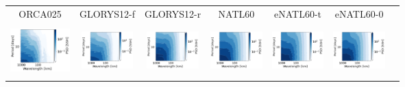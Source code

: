 \documentclass[draft]{agujournal2019}
\begin{document}
\begin{figure}[H]
\begin{minipage}{.80\linewidth}
\begin{subfigure}[t]{.9\linewidth}
\small
\begin{center}
\setlength{\tabcolsep}{1pt}

\begin{tabular}[t]{c@{}cccccc}

\hspace{0cm} ORCA025 & 
 GLORYS12-f & 
 GLORYS12-r & 
 NATL60 & 
 eNATL60-t & 
 eNATL60-0 & \\


\includegraphics[trim={0 19mm 35mm 5mm},clip, width=2.3cm,height=2cm]{figures/plots2/orca025_train_psd_spacetime.png} &
\includegraphics[trim={19mm 19mm 35mm 5mm},clip, width=2cm,height=2cm]{figures/plots2/glorys12-f_train_psd_spacetime.png} &
\includegraphics[trim={19mm 19mm 35mm 5mm},clip, width=2cm,height=2cm]{figures/plots2/glorys12-r_train_psd_spacetime.png} &
\includegraphics[trim={19mm 19mm 35mm 5mm},clip, width=2cm,height=2cm]{figures/plots2/natl60_train_psd_spacetime.png} &
\includegraphics[trim={19mm 19mm 35mm 5mm},clip, width=2cm,height=2cm]{figures/plots2/enatl60-t_train_psd_spacetime.png} &
\includegraphics[trim={19mm 19mm 35mm 5mm},clip, width=2cm,height=2cm]{figures/plots2/enatl60-0_train_psd_spacetime.png} &
 \\


\end{tabular}
\end{center}
\end{subfigure}
\end{minipage}
\end{figure}
\end{document}
